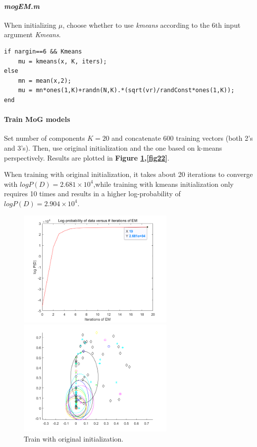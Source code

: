 \documentclass{article}
\begin{document}
\paragraph{\textit{mogEM.m}}
When initializing $\mu$, choose whether to use \textit{kmeans} according to the 6th input argument \textit{Kmeans}.
\begin{lstlisting}
if nargin==6 && Kmeans
    mu = kmeans(x, K, iters);
else
    mn = mean(x,2);
    mu = mn*ones(1,K)+randn(N,K).*(sqrt(vr)/randConst*ones(1,K));
end
\end{lstlisting}

\paragraph{Train MoG models}
Set number of components $K=20$ and concatenate 600 training vectors (both 2’s and 3’s). Then, use original initialization and the one based on k-means perspectively. Results are plotted in \textbf{Figure \ref{fig21},\ref{fig22}}.\par
When training with original initialization, it takes about 20 iterations to converge with $logP(D)=2.681\times 10^{4}$,while training with kmeans initialization only requires 10 times and results in a higher log-probability of $logP(D)=2.904\times 10^{4}$.\par

\begin{figure}[H]
\begin{minipage}[t]{0.5\linewidth}
\centering
\includegraphics[width=3in]{figure21_1}
\end{minipage}%
\begin{minipage}[t]{0.5\linewidth}
\centering
\includegraphics[width=3in]{figure21_2}
\end{minipage}
\caption{Train with original initialization.}
\label{fig21}
\end{figure}
\end{document}
